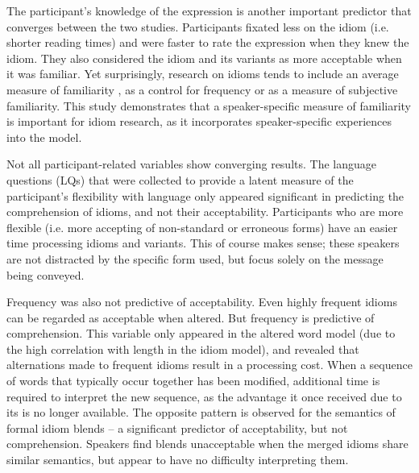 \documentclass[output=paper,modfonts,nonflat]{langsci/langscibook}
\begin{document}
The participant's knowledge of the expression is another important predictor that converges between the two studies.  Participants fixated less on the idiom (i.e. shorter reading times) and were faster to rate the expression when they knew the idiom. They also considered the idiom and its variants as more acceptable when it was familiar. Yet surprisingly, research on idioms tends to include an average measure of familiarity \citep[cf.][]{TitoneConnine1994}, as a control for frequency or as a measure of subjective familiarity. This study demonstrates that a speaker-specific measure of familiarity is important for idiom research, as it incorporates speaker-specific experiences into the model.

Not all participant-related variables show converging results. The language questions (LQs) that were collected to provide a latent measure of the participant's flexibility with language only appeared significant in predicting the comprehension of idioms, and not their acceptability. Participants who are more flexible (i.e. more accepting of non-standard or erroneous forms) have an easier time processing idioms and variants. This of course makes sense; these speakers are not distracted by the specific form used, but focus solely on the message being conveyed.  

Frequency was also not predictive of acceptability. Even highly frequent idioms can be regarded as acceptable when altered. But frequency is predictive of comprehension. This variable only appeared in the altered word model (due to the high correlation with length in the idiom model), and revealed that alternations made to frequent idioms result in a processing cost. When a sequence of words that typically occur together has been modified, additional time is required to interpret the new sequence, as the advantage it once received due to its  is no longer available. The opposite pattern is observed for the semantics of formal idiom blends -- a significant predictor of acceptability, but not comprehension. Speakers find blends unacceptable when the merged idioms share similar semantics, but appear to have no difficulty interpreting them.
\end{document}
